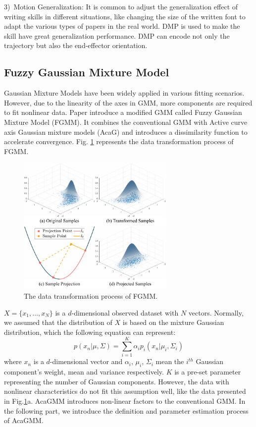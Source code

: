 \documentclass[journal]{IEEEtran}
\begin{document}
3)~Motion Generalization: It is common to adjust the generalization effect of writing skills in different situations, like changing the size of the written font to adapt the various types of papers in the real world. DMP is used to make the skill have great generalization performance. DMP can encode not only the trajectory but also the end-effector orientation.

\subsection{Fuzzy Gaussian Mixture Model}
Gaussian Mixture Models have been widely applied in various fitting scenarios. However, due to the linearity of the axes in GMM, more components are required to fit nonlinear data. Paper \cite{Ju2012} introduce a modified GMM called Fuzzy Gaussian Mixture Model (FGMM). It combines the conventional GMM with Active curve axis Gaussian mixture models (AcaG)\cite{Zhang2005} and introduces a dissimilarity function to accelerate convergence. Fig. \ref{fig2} represents the data transformation process of FGMM.
\begin{figure}[!t]
    \centering
    \includegraphics[width=3in]{./fig/fig2.pdf}
    \caption{The data transformation process of FGMM.}
    \label{fig2}
\end{figure}

$X=\{x_1,\hdots,x_N\}$ is a $d$-dimensional observed dataset with $N$ vectors. Normally, we assumed that the distribution of $X$ is based on the mixture Gaussian distribution, which the following equation can represent:
\begin{equation}
    p(x_n|\mu,\Sigma)=\sum\limits^K_{i=1}\alpha_i p_i(x_n|\mu_i,\Sigma_i)
\end{equation}  
where $x_n$ is a $d$-dimensional vector and $\alpha_i$, $\mu_i$, $\Sigma_i$ mean the $i^{th}$ Gaussian component's weight, mean and variance respectively. $K$ is a pre-set parameter representing the number of Gaussian components. However, the data with nonlinear characteristics do not fit this assumption well, like the data presented in Fig.\ref{fig2}a. AcaGMM introduces non-linear factors to the conventional GMM. In the following part, we introduce the definition and parameter estimation process of AcaGMM.
\end{document}
